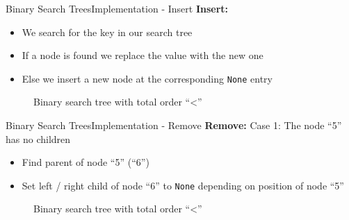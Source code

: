 
\begin{frame}{Binary Search Trees}{Implementation - Insert}
  \textbf{Insert:}
  \begin{itemize}
    \item
      We search for the key in our search tree
    \item
      If a node is found we replace the value with the new one
    \item
      Else we insert a new node at the corresponding
      \texttt{\color{Mittel-Blau}None} entry
  \end{itemize}
  \begin{figure}
    
    \caption{Binary search tree with total order
      \enquote{\color{Mittel-Blau}<}}
    \label{fig:binary_search_trees:binary_tree_insert}
  \end{figure}
\end{frame}


\begin{frame}{Binary Search Trees}{Implementation - Remove}
  \textbf{Remove:} Case 1: The node \enquote{5} has no children\\
  \begin{itemize}
    \item
      Find {\color{Mittel-Blau}parent} of node \enquote{5} (\enquote{6})
    \item
      Set left / right child of node \enquote{6} to
      \texttt{\color{Mittel-Blau}None} depending on position of node \enquote{5}
  \end{itemize}
  \begin{figure}
    
    \caption{Binary search tree with total order
      \enquote{\color{Mittel-Blau}<}}
    \label{fig:binary_search_trees:binary_tree_remove_no_child}
  \end{figure}
\end{frame}


